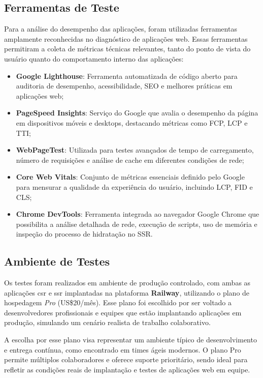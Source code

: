 \subsection{Ferramentas de Teste}

Para a análise do desempenho das aplicações, foram utilizadas ferramentas amplamente reconhecidas no diagnóstico de aplicações web. Essas ferramentas permitiram a coleta de métricas técnicas relevantes, tanto do ponto de vista do usuário quanto do comportamento interno das aplicações:

\begin{itemize}
    \item \textbf{Google Lighthouse}: Ferramenta automatizada de código aberto para auditoria de desempenho, acessibilidade, SEO e melhores práticas em aplicações web;
    \item \textbf{PageSpeed Insights}: Serviço do Google que avalia o desempenho da página em dispositivos móveis e desktops, destacando métricas como FCP, LCP e TTI;
    \item \textbf{WebPageTest}: Utilizada para testes avançados de tempo de carregamento, número de requisições e análise de cache em diferentes condições de rede;
    \item \textbf{Core Web Vitals}: Conjunto de métricas essenciais definido pelo Google para mensurar a qualidade da experiência do usuário, incluindo LCP, FID e CLS;
    \item \textbf{Chrome DevTools}: Ferramenta integrada ao navegador Google Chrome que possibilita a análise detalhada de rede, execução de scripts, uso de memória e inspeção do processo de hidratação no SSR.
\end{itemize}

\subsection{Ambiente de Testes}

Os testes foram realizados em ambiente de produção controlado, com ambas as aplicações \acrshort{csr} e \acrshort{ssr} implantadas na plataforma \textbf{Railway}, utilizando o plano de hospedagem \textit{Pro} (US\$20/mês). Esse plano foi escolhido por ser voltado a desenvolvedores profissionais e equipes que estão implantando aplicações em produção, simulando um cenário realista de trabalho colaborativo.

A escolha por esse plano visa representar um ambiente típico de desenvolvimento e entrega contínua, como encontrado em times ágeis modernos. O plano Pro permite múltiplos colaboradores e oferece suporte prioritário, sendo ideal para refletir as condições reais de implantação e testes de aplicações web em equipe.

